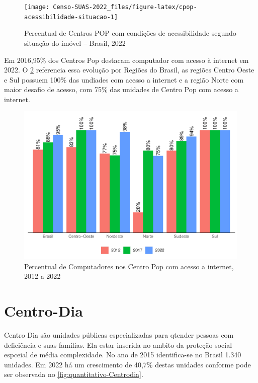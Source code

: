\documentclass[
  brazilian]{report}
\begin{document}
\begin{figure}
\texttt{[image: Censo-SUAS-2022\_files/figure-latex/cpop-acessibilidade-situacao-1]} \caption[Percentual de Centros POP com condições de acessibilidade segundo situação do imóvel – Brasil, 2022]{Percentual de Centros POP com condições de acessibilidade segundo situação do imóvel – Brasil, 2022}\label{fig:cpop-acessibilidade-situacao}
\end{figure}

Em 2016,95\% dos Centros Pop destacam computador com acesso à internet
em 2022. O \cref{fig:cpop-internet-percentual} referencia essa evolução
por Regiões do Brasil, as regiões Centro Oeste e Sul possuem 100\% das
undiades com acesso a internet e a região Norte com maior desafio de
acesso, com 75\% das unidades de Centro Pop com acesso a internet.

\begin{figure}
\includegraphics{Censo-SUAS-2022_files/figure-latex/cpop-internet-percentual-1} \caption[Percentual de Computadores nos Centro Pop com acesso a internet, 2012 a 2022]{Percentual de Computadores nos Centro Pop com acesso a internet, 2012 a 2022}\label{fig:cpop-internet-percentual}
\end{figure}

\hypertarget{centro-dia}{%
\section{Centro-Dia}\label{centro-dia}}

Centro Dia são unidades públicas especializadas para qtender pessoas com
deficiência e suas famílias. Ela estar inserida no ambito da proteção
social espceial de média complexidade. No ano de 2015 identifica-se no
Brasil 1.340 unidades. Em 2022 há um crescimento de 40,7\% destas
unidades conforme pode ser observada no
\cref{fig:quantitativo-Centrodia}.
\end{document}
